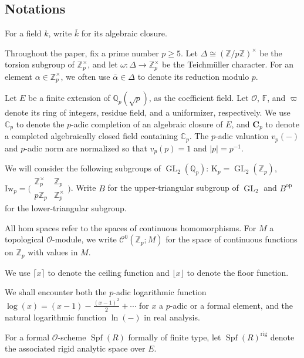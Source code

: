 \documentclass[12pt]{amsart}
\theoremstyle{definition}
\numberwithin{equation}{subsection}
\def\calC{\mathcal{C}}
\def\calO{\mathcal{O}}
\def\CC{\mathbb{C}}
\def\FF{\mathbb{F}}
\def\QQ{\mathbb{Q}}
\def\ZZ{\mathbb{Z}}
\def\bfC{\mathbf{C}}
\def\rmK{\mathrm{K}}
\DeclareMathOperator{\GL}{GL}
\DeclareMathOperator{\Spf}{Spf}
\newcommand{\Iw}{\mathrm{Iw}}
\newcommand{\rig}{\mathrm{rig}}
\newcommand{\Matrix}[4]{{\big(\begin{smallmatrix}#1&#2\\#3& #4\end{smallmatrix} \big)}}
\begin{document}
\subsection{Notations}
\label{notation}
For a field $k$, write $\overline k$ for its algebraic closure.


Throughout the paper, fix a prime number $p\geq 5$. 
Let $\Delta \cong (\ZZ/p\ZZ)^\times$ be the torsion subgroup of
$\ZZ_p^\times$, and let $\omega:\Delta\rightarrow \ZZ_p^\times$ be the
Teichm\"{u}ller character.
For an element $\alpha \in \ZZ_p^\times$, we often use $\bar \alpha \in \Delta $ to denote its reduction modulo $p$.

Let $E$ be a finite extension of $\QQ_p(\sqrt p)$, as the coefficient field. Let $\calO$, $\FF$, and $\varpi$ denote its ring of integers, residue field, and a uniformizer, respectively. We use $\CC_p$ to denote the $p$-adic completion of an algebraic closure of $E$, and $\bfC_p$ to denote a completed algebraically closed field containing $\CC_p$.
The $p$-adic valuation $v_p(-)$ and $p$-adic norm are normalized so that $v_p(p) =1$ and $|p|=p^{-1}$.

We will consider the following subgroups of $\GL_2(\QQ_p)$: $\rmK_p = \GL_2(\ZZ_p)$, $\Iw_p = \Matrix{\ZZ_p^\times}{\ZZ_p}{p\ZZ_p}{\ZZ_p^\times}$. Write $B$ for the upper-triangular subgroup of $\GL_2$ and $B^\mathrm{op}$ for the lower-triangular subgroup.

All hom spaces refer to the spaces of continuous homomorphisms.
For $M$ a topological $\calO$-module, we write $\calC^0(\ZZ_p; M)$ for the space of continuous functions on $\ZZ_p$ with values in $M$.

We use $\lceil x\rceil$ to denote the ceiling function and $\lfloor x\rfloor$ to denote the floor function.


We shall encounter both the $p$-adic logarithmic function $\log(x) = (x-1) - \frac{(x-1)^2}2 + \cdots $ for $x$ a $p$-adic or a formal element,  and the natural logarithmic function $\ln(-)$ in real analysis.


\medskip
For a formal $\calO$-scheme $\Spf(R)$ formally of finite type, let $\Spf(R)^\rig$ denote the associated rigid analytic space over $E$. 
\end{document}
